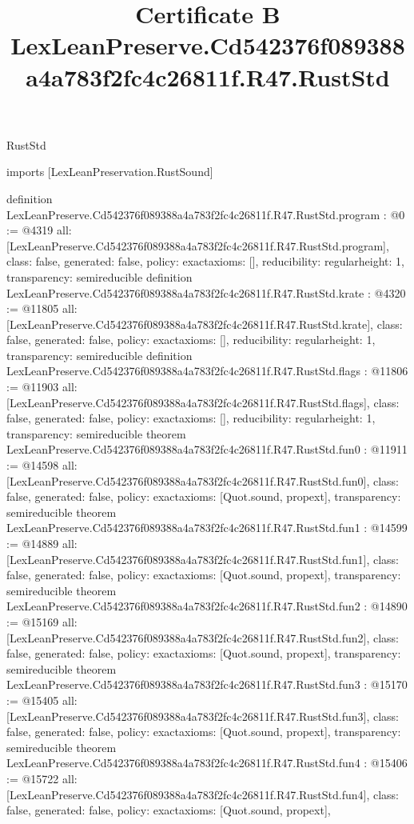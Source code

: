 \begin{lexlean}{RustStd}
\title{Certificate B LexLeanPreserve.Cd542376f089388a4a783f2fc4c26811f.R47.RustStd}
\begin{coremodule}
imports [LexLeanPreservation.RustSound]

definition LexLeanPreserve.Cd542376f089388a4a783f2fc4c26811f.R47.RustStd.program : @0 := @4319 {
  all: [LexLeanPreserve.Cd542376f089388a4a783f2fc4c26811f.R47.RustStd.program],
  class: false,
  generated: false,
  policy: exact{axioms: []},
  reducibility: regular{height: 1},
  transparency: semireducible
}
definition LexLeanPreserve.Cd542376f089388a4a783f2fc4c26811f.R47.RustStd.krate : @4320 := @11805 {
  all: [LexLeanPreserve.Cd542376f089388a4a783f2fc4c26811f.R47.RustStd.krate],
  class: false,
  generated: false,
  policy: exact{axioms: []},
  reducibility: regular{height: 1},
  transparency: semireducible
}
definition LexLeanPreserve.Cd542376f089388a4a783f2fc4c26811f.R47.RustStd.flags : @11806 := @11903 {
  all: [LexLeanPreserve.Cd542376f089388a4a783f2fc4c26811f.R47.RustStd.flags],
  class: false,
  generated: false,
  policy: exact{axioms: []},
  reducibility: regular{height: 1},
  transparency: semireducible
}
theorem LexLeanPreserve.Cd542376f089388a4a783f2fc4c26811f.R47.RustStd.fun0 : @11911 := @14598 {
  all: [LexLeanPreserve.Cd542376f089388a4a783f2fc4c26811f.R47.RustStd.fun0],
  class: false,
  generated: false,
  policy: exact{axioms: [Quot.sound, propext]},
  transparency: semireducible
}
theorem LexLeanPreserve.Cd542376f089388a4a783f2fc4c26811f.R47.RustStd.fun1 : @14599 := @14889 {
  all: [LexLeanPreserve.Cd542376f089388a4a783f2fc4c26811f.R47.RustStd.fun1],
  class: false,
  generated: false,
  policy: exact{axioms: [Quot.sound, propext]},
  transparency: semireducible
}
theorem LexLeanPreserve.Cd542376f089388a4a783f2fc4c26811f.R47.RustStd.fun2 : @14890 := @15169 {
  all: [LexLeanPreserve.Cd542376f089388a4a783f2fc4c26811f.R47.RustStd.fun2],
  class: false,
  generated: false,
  policy: exact{axioms: [Quot.sound, propext]},
  transparency: semireducible
}
theorem LexLeanPreserve.Cd542376f089388a4a783f2fc4c26811f.R47.RustStd.fun3 : @15170 := @15405 {
  all: [LexLeanPreserve.Cd542376f089388a4a783f2fc4c26811f.R47.RustStd.fun3],
  class: false,
  generated: false,
  policy: exact{axioms: [Quot.sound, propext]},
  transparency: semireducible
}
theorem LexLeanPreserve.Cd542376f089388a4a783f2fc4c26811f.R47.RustStd.fun4 : @15406 := @15722 {
  all: [LexLeanPreserve.Cd542376f089388a4a783f2fc4c26811f.R47.RustStd.fun4],
  class: false,
  generated: false,
  policy: exact{axioms: [Quot.sound, propext]},
}
\end{coremodule}
\end{lexlean}
